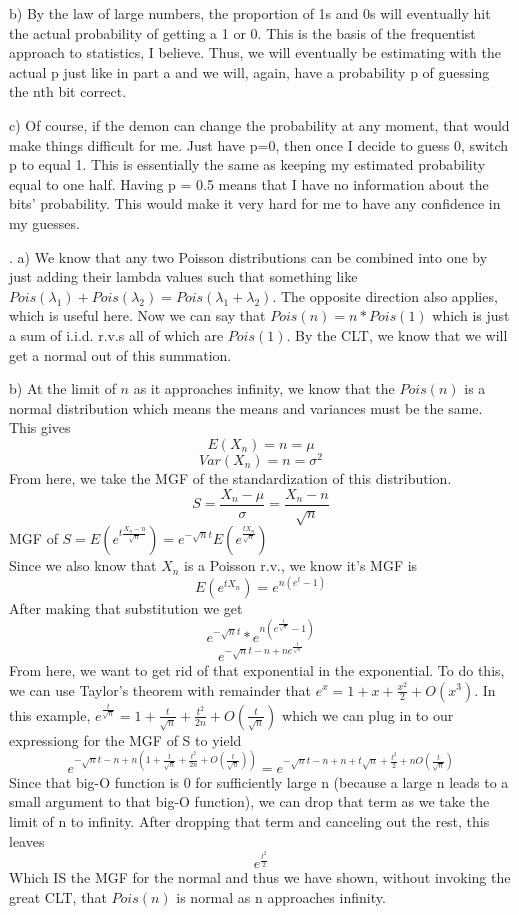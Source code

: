 \documentclass[11pt]{article}
\begin{document}
	b) By the law of large numbers, the proportion of 1s and 0s will eventually hit the actual probability of getting a 1 or 0.  This is the basis of the frequentist approach to statistics, I believe.  Thus, we will eventually be estimating with the actual p just like in part a and we will, again, have a probability p of guessing the nth bit correct.  

\smallskip

	c) Of course, if the demon can change the probability at any moment, that would make things difficult for me. Just have p=0, then once I decide to guess 0, switch p to equal 1.  This is essentially the same as keeping my estimated probability equal to one half.  Having p = 0.5 means that I have no information about the bits' probability.  This would make it very hard for me to have any confidence in my guesses.


\bigskip

. 
	a) We know that any two Poisson distributions can be combined into one by just adding their lambda values such that something like $Pois(\lambda_1) + Pois(\lambda_2) = Pois(\lambda_1 + \lambda_2)$.  The opposite direction also applies, which is useful here.  Now we can say that $Pois(n)=n*Pois(1)$ which is just a sum of i.i.d. r.v.s all of which are $Pois(1)$.  By the CLT, we know that we will get a normal out of this summation. 

\smallskip
	b) At the limit of $n$ as it approaches infinity, we know that the $Pois(n)$ is a normal distribution which means the means and variances must be the same.  This gives
		$$E(X_n) = n = \mu$$
		$$Var(X_n) = n = \sigma^2$$
	From here, we take the MGF of the standardization of this distribution.    
	$$S = \frac{X_n - \mu}{\sigma} = \frac{X_n - n}{\sqrt{n}}$$
	MGF of $S = E(e^{t\frac{X_n - n}{\sqrt{n}}}) = e^{-\sqrt{n}t}E(e^\frac{{tX_n}}{\sqrt{n}}) $ \\
	Since we also know that $X_n$ is a Poisson r.v., we know it's MGF is
	$$E(e^{tX_n}) = e^{n(e^t-1)}$$
	After making that substitution we get
	$$ e^{-\sqrt{n}t}*e^{n(e^{\frac{t}{\sqrt{n}}}-1)} $$
	$$ e^{-\sqrt{n}t-n+ne^{\frac{t}{\sqrt{n}}}} $$
	From here, we want to get rid of that exponential in the exponential.  To do this, we can use Taylor's theorem with remainder that $e^x = 1 + x + \frac{x^2}{2} + O(x^3)$.  In this example, $e^{\frac{t}{\sqrt{n}}} = 1+\frac{t}{\sqrt{n}} + \frac{t^2}{2n} + O(\frac{t}{\sqrt{n}})$ which we can plug in to our expressiong for the MGF of S to yield 
	$$e^{-\sqrt{n}t-n+n(1+\frac{t}{\sqrt{n}} + \frac{t^2}{2n} + O(\frac{t}{\sqrt{n}}))} = e^{-\sqrt{n}t-n+n+t\sqrt{n} + \frac{t^2}{2} + nO(\frac{t}{\sqrt{n}})}$$
	Since that big-O function is 0 for sufficiently large n (because a large n leads to a small argument to that big-O function), we can drop that term as we take the limit of n to infinity. After dropping that term and canceling out the rest, this leaves 
	$$e^{\frac{t^2}{2}}$$
	Which IS the MGF for the normal and thus we have shown, without invoking the great CLT, that $Pois(n)$ is normal as n approaches infinity. 
	
\end{document}
